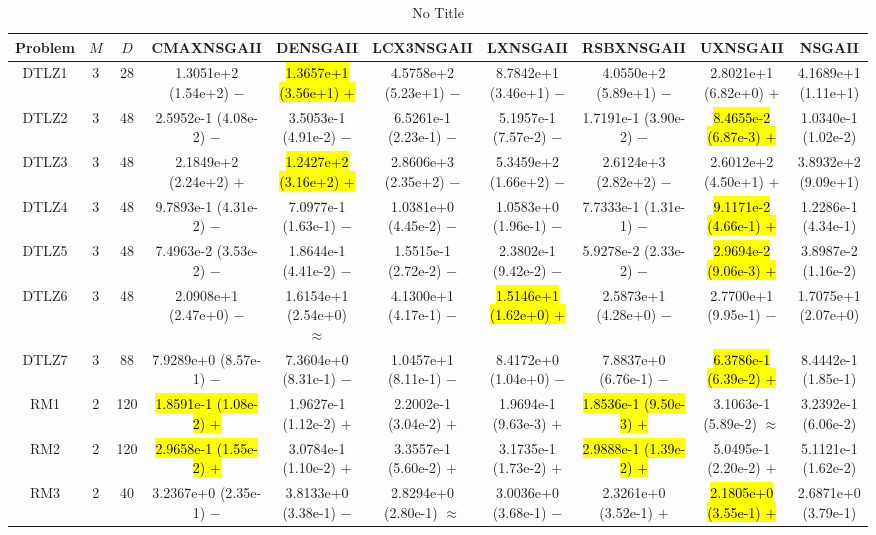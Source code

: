 \documentclass[journal]{IEEEtran}
\begin{document}
\begin{table*}[htbp]
\renewcommand{\arraystretch}{1.2}
\centering
\caption{No Title}
\begin{tabular}{cccccccccc}
\toprule
Problem&$M$&$D$&CMAXNSGAII&DENSGAII&LCX3NSGAII&LXNSGAII&RSBXNSGAII&UXNSGAII&NSGAII\\
\midrule
\multirow{1}{*}{DTLZ1}&3&28&1.3051e+2 (1.54e+2) $-$&\hl{1.3657e+1 (3.56e+1) $+$}&4.5758e+2 (5.23e+1) $-$&8.7842e+1 (3.46e+1) $-$&4.0550e+2 (5.89e+1) $-$&2.8021e+1 (6.82e+0) $+$&4.1689e+1 (1.11e+1)\\
\hline
\multirow{1}{*}{DTLZ2}&3&48&2.5952e-1 (4.08e-2) $-$&3.5053e-1 (4.91e-2) $-$&6.5261e-1 (2.23e-1) $-$&5.1957e-1 (7.57e-2) $-$&1.7191e-1 (3.90e-2) $-$&\hl{8.4655e-2 (6.87e-3) $+$}&1.0340e-1 (1.02e-2)\\
\hline
\multirow{1}{*}{DTLZ3}&3&48&2.1849e+2 (2.24e+2) $+$&\hl{1.2427e+2 (3.16e+2) $+$}&2.8606e+3 (2.35e+2) $-$&5.3459e+2 (1.66e+2) $-$&2.6124e+3 (2.82e+2) $-$&2.6012e+2 (4.50e+1) $+$&3.8932e+2 (9.09e+1)\\
\hline
\multirow{1}{*}{DTLZ4}&3&48&9.7893e-1 (4.31e-2) $-$&7.0977e-1 (1.63e-1) $-$&1.0381e+0 (4.45e-2) $-$&1.0583e+0 (1.96e-1) $-$&7.7333e-1 (1.31e-1) $-$&\hl{9.1171e-2 (4.66e-1) $+$}&1.2286e-1 (4.34e-1)\\
\hline
\multirow{1}{*}{DTLZ5}&3&48&7.4963e-2 (3.53e-2) $-$&1.8644e-1 (4.41e-2) $-$&1.5515e-1 (2.72e-2) $-$&2.3802e-1 (9.42e-2) $-$&5.9278e-2 (2.33e-2) $-$&\hl{2.9694e-2 (9.06e-3) $+$}&3.8987e-2 (1.16e-2)\\
\hline
\multirow{1}{*}{DTLZ6}&3&48&2.0908e+1 (2.47e+0) $-$&1.6154e+1 (2.54e+0) $\approx$&4.1300e+1 (4.17e-1) $-$&\hl{1.5146e+1 (1.62e+0) $+$}&2.5873e+1 (4.28e+0) $-$&2.7700e+1 (9.95e-1) $-$&1.7075e+1 (2.07e+0)\\
\hline
\multirow{1}{*}{DTLZ7}&3&88&7.9289e+0 (8.57e-1) $-$&7.3604e+0 (8.31e-1) $-$&1.0457e+1 (8.11e-1) $-$&8.4172e+0 (1.04e+0) $-$&7.8837e+0 (6.76e-1) $-$&\hl{6.3786e-1 (6.39e-2) $+$}&8.4442e-1 (1.85e-1)\\
\hline
\multirow{1}{*}{RM1}&2&120&\hl{1.8591e-1 (1.08e-2) $+$}&1.9627e-1 (1.12e-2) $+$&2.2002e-1 (3.04e-2) $+$&1.9694e-1 (9.63e-3) $+$&\hl{1.8536e-1 (9.50e-3) $+$}&3.1063e-1 (5.89e-2) $\approx$&3.2392e-1 (6.06e-2)\\
\hline
\multirow{1}{*}{RM2}&2&120&\hl{2.9658e-1 (1.55e-2) $+$}&3.0784e-1 (1.10e-2) $+$&3.3557e-1 (5.60e-2) $+$&3.1735e-1 (1.73e-2) $+$&\hl{2.9888e-1 (1.39e-2) $+$}&5.0495e-1 (2.20e-2) $+$&5.1121e-1 (1.62e-2)\\
\hline
\multirow{1}{*}{RM3}&2&40&3.2367e+0 (2.35e-1) $-$&3.8133e+0 (3.38e-1) $-$&2.8294e+0 (2.80e-1) $\approx$&3.0036e+0 (3.68e-1) $-$&2.3261e+0 (3.52e-1) $+$&\hl{2.1805e+0 (3.55e-1) $+$}&2.6871e+0 (3.79e-1)\\

\end{tabular}
\end{table*}
\end{document}
